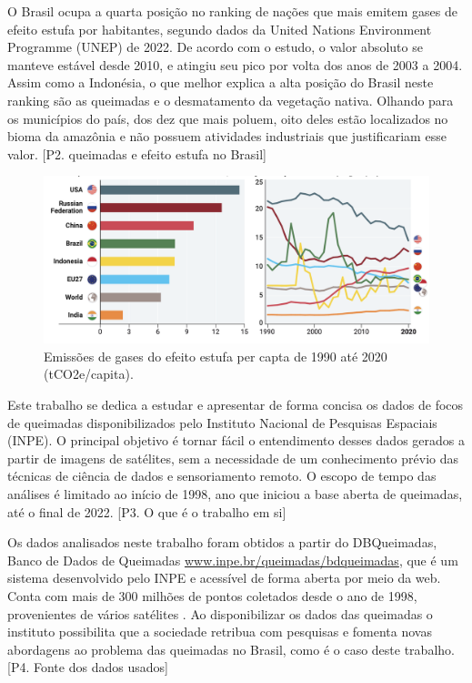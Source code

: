 \documentclass[cic,tc]{iiufrgs}
\begin{document}
O Brasil ocupa a quarta posição no ranking de nações que mais emitem gases de efeito estufa por habitantes, segundo dados da United Nations Environment Programme (UNEP) de 2022. De acordo com o estudo, o valor absoluto se manteve estável desde 2010, e atingiu seu pico por volta dos anos de 2003 a 2004. Assim como a Indonésia, o que melhor explica a alta posição do Brasil neste ranking são as queimadas e o desmatamento da vegetação nativa. Olhando para os municípios do país, dos dez que mais poluem, oito deles estão localizados no bioma da amazônia e não possuem atividades industriais que justificariam esse valor. [P2. queimadas e efeito estufa no Brasil] \par

\begin{figure}[H]
    \caption{Emissões de gases do efeito estufa per capta de 1990 até 2020 (tCO2e/capita).}
    \begin{center}
        \includegraphics[width=35em]{emissoes_gee_per_capta}
    \end{center}
    \label{fig:emissoes_gee_per_capta}
\end{figure}

Este trabalho se dedica a estudar e apresentar de forma concisa os dados de focos de queimadas disponibilizados pelo Instituto Nacional de Pesquisas Espaciais (INPE). O principal objetivo é tornar fácil o entendimento desses dados gerados a partir de imagens de satélites, sem a necessidade de um conhecimento prévio das técnicas de ciência de dados e sensoriamento remoto. O escopo de tempo das análises é limitado ao início de 1998, ano que iniciou a base aberta de queimadas, até o final de 2022. [P3. O que é o trabalho em si] \par

Os dados analisados neste trabalho foram obtidos a partir do DBQueimadas, Banco de Dados de Queimadas \url{www.inpe.br/queimadas/bdqueimadas}, que é um sistema desenvolvido pelo INPE e acessível de forma aberta por meio da web. Conta com mais de 300 milhões de pontos coletados desde o ano de 1998, provenientes de vários satélites \citep{setzer2019banco}. Ao disponibilizar os dados das queimadas o instituto possibilita que a sociedade retribua com pesquisas e fomenta novas abordagens ao problema das queimadas no Brasil, como é o caso deste trabalho. [P4. Fonte dos dados usados] \par
\end{document}
